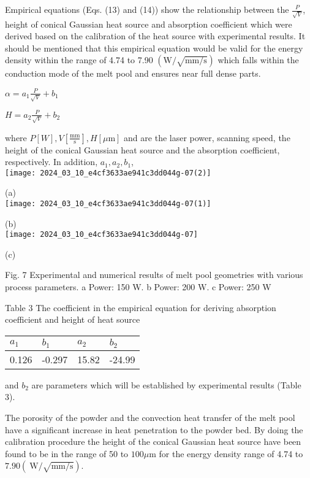 \documentclass[10pt]{article}
\begin{document}
Empirical equations (Eqs. (13) and (14)) show the relationship between the $\frac{P}{\sqrt{V}}$, height of conical Gaussian heat source and absorption coefficient which were derived based on the calibration of the heat source with experimental results. It should be mentioned that this empirical equation would be valid for the energy density within the range of 4.74 to 7.90 $(\mathrm{W} / \sqrt{\mathrm{mm} / \mathrm{s}})$ which falls within the conduction mode of the melt pool and ensures near full dense parts.

$\alpha=a_{1} \frac{P}{\sqrt{V}}+b_{1}$

$H=a_{2} \frac{P}{\sqrt{V}}+b_{2}$

where $P[W], V\left[\frac{\mathrm{mm}}{\mathrm{s}}\right], H[\mu \mathrm{m}]$ and are the laser power, scanning speed, the height of the conical Gaussian heat source and the absorption coefficient, respectively. In addition, $a_{1}, a_{2}, b_{1}$,\\
\texttt{[image: 2024\_03\_10\_e4cf3633ae941c3dd044g-07(2)]}

(a)\\
\texttt{[image: 2024\_03\_10\_e4cf3633ae941c3dd044g-07(1)]}

(b)\\
\texttt{[image: 2024\_03\_10\_e4cf3633ae941c3dd044g-07]}

(c)

Fig. 7 Experimental and numerical results of melt pool geometries with various process parameters. a Power: 150 W. b Power: 200 W. c Power: 250 W

Table 3 The coefficient in the empirical equation for deriving absorption coefficient and height of heat source

\begin{center}
\begin{tabular}{llll}
\hline
$a_{1}$ & $b_{1}$ & $a_{2}$ & $b_{2}$ \\
\hline
0.126 & -0.297 & 15.82 & -24.99 \\
\hline
\end{tabular}
\end{center}

and $b_{2}$ are parameters which will be established by experimental results (Table 3).

The porosity of the powder and the convection heat transfer of the melt pool have a significant increase in heat penetration to the powder bed. By doing the calibration procedure the height of the conical Gaussian heat source have been found to be in the range of 50 to $100 \mu \mathrm{m}$ for the energy density range of 4.74 to $7.90(\mathrm{~W} / \sqrt{\mathrm{mm} / \mathrm{s}})$.
\end{document}
